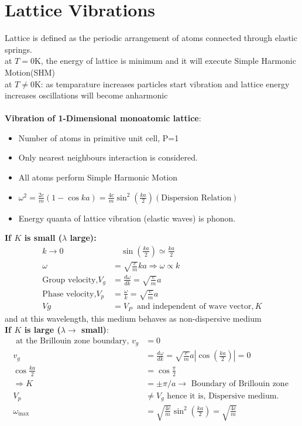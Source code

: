 \section{Lattice Vibrations}
Lattice is defined as the periodic arrangement of atoms connected through elastic springs.\\
at $T=0\text{K}$, the energy of lattice is minimum and it will execute Simple Harmonic Motion(SHM)\\
at $T\neq0\text{K}$: as temparature increases particles start vibration and lattice energy increases oscillations will become anharmonic\\\\
\textbf{Vibration of 1-Dimensional monoatomic lattice}:
\begin{itemize}
	\item Number of atoms in primitive unit cell, P=1
\item Only nearest neighbours interaction is considered.
\item All atoms perform Simple Harmonic Motion 
\item $\omega^{2}=\frac{2 c}{m}(1-\cos k a)=\frac{4 c}{m} \sin ^{2}\left(\frac{k a}{2}\right)(\text{Dispersion Relation})$
\item Energy quanta of lattice vibration (elastic waves) is phonon.
\end{itemize}
\textbf{If $K$ is small ($\lambda$ large):}
\begin{align*}
k \rightarrow 0 &\quad \sin \left(\frac{k a}{2}\right) \simeq \frac{k a}{2}\\
\omega&=\sqrt{\frac{c}{m}} k a \Rightarrow \omega \propto k\\
\text{Group velocity,}V_{g}&=\frac{d \omega}{d k}=\sqrt{\frac{c}{m}} a\\
\text{Phase velocity,}V_{p}&=\frac{\omega}{k}=\sqrt{\frac{c}{m}} a\\
V g&=V_{P} \ \text { and independent of wave vector}, K
\end{align*}
 and at this wavelength, this medium behaves as non-dispersive medium\\
\textbf{If $K$ is large ($\lambda\rightarrow$ small)}:
\begin{align*}
\text { at the Brillouin zone boundary, } v_{g}&=0\\
v_{g}&=\frac{d \omega}{d k}=\sqrt{\frac{c}{m}} a\left|\cos \left(\frac{k a}{2}\right)\right|=0\\
\cos \frac{k a}{2}&=\cos \frac{\pi}{2}\\
\Rightarrow K&=\pm \pi / a \rightarrow \text { Boundary of Brillouin zone } \\
V_{p} &\neq V_{g} \text { hence it is, Dispersive medium. }\\
\omega_{\max }&=\sqrt{\frac{4 c}{m}} \sin ^{2}\left(\frac{k a}{2}\right)=\sqrt{\frac{4 c}{m}}
\end{align*}
